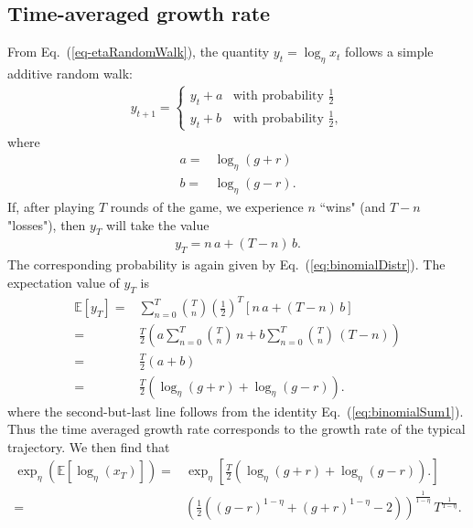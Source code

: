 \documentclass[11pt]{article}
\begin{document}
\begin{multicols}{2}
\section{Time-averaged growth rate}
From Eq.~(\ref{eq-etaRandomWalk}), the quantity $y_t = \log_\eta x_t$ follows a simple additive random walk:
\begin{align}
\label{eq-addRandomWalk}
y_{t+1} = \left\{ 
\begin{array}{ll}
y_t + a& \text{with probability $\frac{1}{2}$}\\
y_t + b  & \text{with probability $\frac{1}{2}$},
\end{array}
\right.
\end{align}
where 
\begin{align*}
a =& \log_\eta (g+r)\\
b = & \log_\eta (g-r). 
\end{align*}
If, after playing $T$ rounds of the game, we experience $n$ ``wins" (and $T-n$ "losses"), then $y_T$ will take the value
\begin{align*}
y_T =  n\, a + (T-n)\,b.
\end{align*}
The corresponding probability is again given by Eq.~(\ref{eq:binomialDistr}). 
The expectation value of $y_T$ is 
\begin{align}
\nonumber \mathbb{E}\left[y_T \right] =& \sum_{n=0}^T  {T \choose n} \left(\frac{1}{2}\right)^T  \left[ n\, a + (T-n)\,b \right] \\
\nonumber  = & \frac{T}{2} \left( a \sum_{n=0}^T {T \choose n} \,n + b \sum_{n=0}^T {T \choose n} \,(T-n)\right)\\
\nonumber =&  \frac{T}{2} \left(a  + b \right)\\
\label{eq-expectationyT} =&   \frac{T}{2} \left(\log_\eta(g+r)  + \log_\eta(g-r) \right).
\end{align}
where the second-but-last line follows from the identity Eq.~(\ref{eq:binomialSum1}).
Thus the time averaged growth rate corresponds to the growth rate of the typical trajectory.
We then find that
\begin{align}
\nonumber \exp_\eta \left( \mathbb{E}\left[\log_\eta(x_T) \right]\right) = & \exp_\eta \left[  \frac{T}{2} \left(\log_\eta(g+r)  + \log_\eta(g-r) \right).\right]\\
= & \left(\frac{1}{2}  \left((g-r)^{1-\eta }+(g+r)^{1-\eta }-2\right)\right)^\frac{1}{1-\eta} \, T^\frac{1}{1-\eta}.
\end{align}


\end{multicols}
\end{document}

